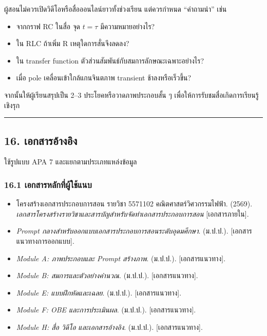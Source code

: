 ผู้สอนไม่ควรเปิดวิดีโอหรือสื่อออนไลน์ยาวทั้งช่วงเรียน แต่ควรกำหนด “คำถามนำ” เช่น

\begin{itemize}
    \item จากกราฟ RC ในสื่อ จุด $t=\tau$ มีความหมายอย่างไร?
    \item ใน RLC ถ้าเพิ่ม R เหตุใดการสั่นจึงลดลง?
    \item ใน transfer function ตัวส่วนสัมพันธ์กับสมการลักษณะเฉพาะอย่างไร?
    \item เมื่อ pole เคลื่อนเข้าใกล้แกนจินตภาพ transient ช้าลงหรือเร็วขึ้น?
\end{itemize}

จากนั้นให้ผู้เรียนสรุปเป็น 2–3 ประโยคหรือวาดภาพประกอบสั้น ๆ เพื่อให้การรับชมสื่อเกิดการเรียนรู้เชิงรุก

\par\noindent\rule{\textwidth}{0.4pt}\par

\subsection{16. เอกสารอ้างอิง}

ใช้รูปแบบ APA 7 และแยกตามประเภทแหล่งข้อมูล

\subsubsection{16.1 เอกสารหลักที่ผู้ใช้แนบ}

\begin{itemize}
    \item โครงสร้างเอกสารประกอบการสอน รายวิชา 5571102 คณิตศาสตร์วิศวกรรมไฟฟ้า. (2569). \textit{เอกสารโครงสร้างรายวิชาและสารบัญสำหรับจัดทำเอกสารประกอบการสอน} [เอกสารภายใน].
    \item \textit{Prompt กลางสำหรับออกแบบเอกสารประกอบการสอนระดับอุดมศึกษา}. (ม.ป.ป.). [เอกสารแนวทางการออกแบบ].
    \item \textit{Module A: ภาพประกอบและ Prompt สร้างภาพ}. (ม.ป.ป.). [เอกสารแนวทาง].
    \item \textit{Module B: สมการและตัวอย่างคำนวณ}. (ม.ป.ป.). [เอกสารแนวทาง].
    \item \textit{Module E: แบบฝึกหัดและเฉลย}. (ม.ป.ป.). [เอกสารแนวทาง].
    \item \textit{Module F: OBE และการประเมินผล}. (ม.ป.ป.). [เอกสารแนวทาง].
    \item \textit{Module H: สื่อ วิดีโอ และเอกสารอ้างอิง}. (ม.ป.ป.). [เอกสารแนวทาง].
\end{itemize}


